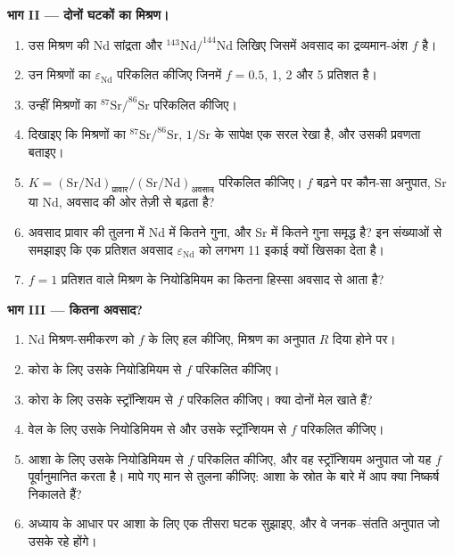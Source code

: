 \begin{problem}
\noindent\textbf{भाग II --- दोनों घटकों का मिश्रण।}
\begin{enumerate}[resume]
\item उस मिश्रण की Nd सांद्रता और $^{143}\mathrm{Nd}/^{144}\mathrm{Nd}$ लिखिए
जिसमें अवसाद का द्रव्यमान-अंश $f$ है।
\item उन मिश्रणों का $\varepsilon_{\mathrm{Nd}}$ परिकलित कीजिए जिनमें $f = 0.5$, 1, 2 और 5
प्रतिशत है।
\item उन्हीं मिश्रणों का $^{87}\mathrm{Sr}/^{86}\mathrm{Sr}$ परिकलित कीजिए।
\item दिखाइए कि मिश्रणों का $^{87}\mathrm{Sr}/^{86}\mathrm{Sr}$, $1/\mathrm{Sr}$ के सापेक्ष एक सरल
रेखा है, और उसकी प्रवणता बताइए।
\item $K = (\mathrm{Sr}/\mathrm{Nd})_{\text{प्रावार}}/(\mathrm{Sr}/\mathrm{Nd})_{\text{अवसाद}}$ परिकलित कीजिए।
$f$ बढ़ने पर कौन-सा अनुपात, Sr या Nd, अवसाद की ओर तेज़ी से बढ़ता है?
\item अवसाद प्रावार की तुलना में Nd में कितने गुना, और Sr में कितने गुना समृद्ध है?
इन संख्याओं से समझाइए कि एक प्रतिशत अवसाद
$\varepsilon_{\mathrm{Nd}}$ को लगभग 11 इकाई क्यों खिसका देता है।
\item $f = 1$ प्रतिशत वाले मिश्रण के नियोडिमियम का कितना हिस्सा
अवसाद से आता है?
\end{enumerate}

\noindent\textbf{भाग III --- कितना अवसाद?}
\begin{enumerate}[resume]
\item Nd मिश्रण-समीकरण को $f$ के लिए हल कीजिए, मिश्रण का अनुपात $R$ दिया होने पर।
\item कोरा के लिए उसके नियोडिमियम से $f$ परिकलित कीजिए।
\item कोरा के लिए उसके स्ट्रॉन्शियम से $f$ परिकलित कीजिए। क्या दोनों मेल खाते हैं?
\item वेल के लिए उसके नियोडिमियम से और उसके स्ट्रॉन्शियम से $f$ परिकलित कीजिए।
\item आशा के लिए उसके नियोडिमियम से $f$ परिकलित कीजिए, और वह स्ट्रॉन्शियम अनुपात जो यह $f$
पूर्वानुमानित करता है। मापे गए मान से तुलना कीजिए: आशा के स्रोत के बारे में आप क्या
निष्कर्ष निकालते हैं?
\item अध्याय के आधार पर आशा के लिए एक तीसरा घटक सुझाइए, और वे
जनक--संतति अनुपात जो उसके रहे होंगे।
\end{enumerate}


\end{problem}
